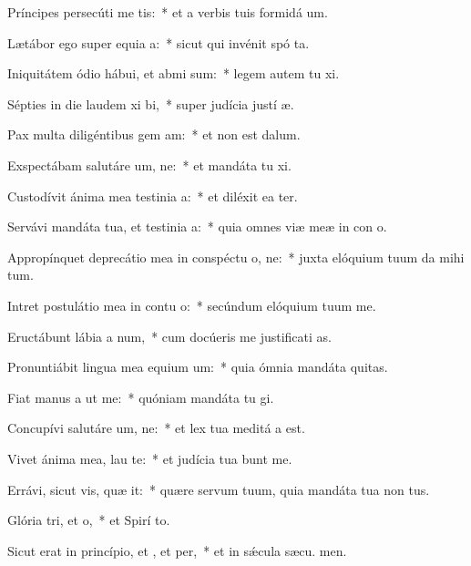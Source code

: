 \item Príncipes persecúti  me tis:~* et a verbis tuis formidá  um.
\item Lætábor ego super equia a:~* sicut qui invénit spó ta.
\item Iniquitátem ódio hábui, et abmi sum:~* legem autem tu xi.
\item Sépties in die laudem xi bi,~* super judícia justí æ.
\item Pax multa diligéntibus gem am:~* et non est  dalum.
\item Exspectábam salutáre um, ne:~* et mandáta tu xi.
\item Custodívit ánima mea testinia a:~* et diléxit ea ter.
\item Servávi mandáta tua, et testinia a:~* quia omnes viæ meæ in con o.
\item Appropínquet deprecátio mea in conspéctu o, ne:~* juxta elóquium tuum da mihi tum.
\item Intret postulátio mea in contu o:~* secúndum elóquium tuum  me.
\item Eructábunt lábia a num,~* cum docúeris me justificati as.
\item Pronuntiábit lingua mea equium um:~* quia ómnia mandáta  quitas.
\item Fiat manus a ut  me:~* quóniam mandáta tu gi.
\item Concupívi salutáre um, ne:~* et lex tua meditá a est.
\item Vivet ánima mea,  lau te:~* et judícia tua bunt me.
\item Errávi, sicut vis, quæ it:~* quære servum tuum, quia mandáta tua non  tus.
\item Glória tri, et o,~* et Spirí to.
\item Sicut erat in princípio, et , et per,~* et in sǽcula sæcu. men.
